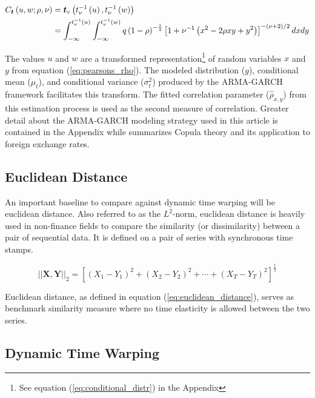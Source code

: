 \begin{align} \label{eq:t_copula}
    C_{\boldsymbol{t}} \left(u, w; \rho,\nu \right) &= \boldsymbol{t}_{v}\left(t_{\nu}^{-1}\left(u\right), t_{\nu}^{-1}\left(w\right)\right) \\
    &= \int_{-\infty}^{t_{\nu}^{-1}\left(u\right)}\int_{-\infty}^{t_{\nu}^{-1}\left(w\right)}q\left(1-\rho\right)^{-\frac{1}{2}}\left[1+\nu^{-1}\left(x^{2}-2\rho xy + y^{2}\right)\right]^{-\left(\nu + 2\right)
    /2}dxdy \notag
\end{align}

The values $u$ and $w$ are a transformed representation\footnote{See equation (\ref{eq:conditional_distr}) in the Appendix} of random variables $x$ and $y$ from equation (\ref{eq:pearsons_rho}). The modeled distribution ($g$), conditional mean ($\mu_{t}$), and conditional variance ($\sigma_{t}^{2}$) produced by the ARMA-GARCH framework facilitates this transform. The fitted correlation parameter ($\hat{\rho}_{x, y}$) from this estimation process is used as the second measure of correlation. Greater detail about the ARMA-GARCH modeling strategy used in this article is contained in the Appendix while \cite{DowiakTV-COP} summarizes Copula theory and its application to foreign exchange rates.


\subsection{Euclidean Distance} \label{sec:euclidean_distance}

An important baseline to compare against dynamic time warping will be euclidean distance. Also referred to as the $L^{2}$-norm, euclidean distance is heavily used in non-finance fields to compare the similarity (or dissimilarity) between a pair of sequential data. It is defined on a pair of series with synchronous time stamps.

\begin{equation} \label{eq:euclidean_distance}
    ||\boldsymbol{X}, \boldsymbol{Y}||_{2} = \left[ (X_{1} - Y_{1})^{2} + (X_{2} - Y_{2})^{2} + \cdots + (X_{T} - Y_{T})^{2} \right]^{\frac{1}{2}}
\end{equation}

Euclidean distance, as defined in equation (\ref{eq:euclidean_distance}), serves as benchmark similarity measure where no time elasticity is allowed between the two series.


\subsection{Dynamic Time Warping} \label{sec:DTW}

